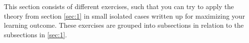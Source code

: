 This section consists of different exercises, such that you can try to apply the theory from section \ref{sec:1} in small isolated cases written up for maximizing your learning outcome. These exercises are grouped into subsections in relation to the subsections in \ref{sec:1}.